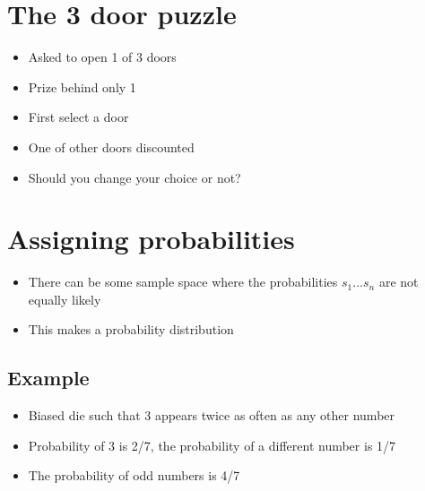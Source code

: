 \documentclass{article}[18pt]
\begin{document}
\section{The 3 door puzzle}
\begin{itemize}
\item Asked to open 1 of 3 doors
\item Prize behind only 1
\item First select a door
\item One of other doors discounted
\item Should you change your choice or not?
\end{itemize}
\section{Assigning probabilities}
\begin{itemize}
\item There can be some sample space where the probabilities $s_1...s_n$ are not equally likely
\item This makes a probability distribution
\end{itemize}
\subsection{Example}
\begin{itemize}
\item Biased die such that 3 appears twice as often as any other number
\item Probability of 3 is 2/7, the probability of a different number is 1/7
\item The probability of odd numbers is 4/7
\end{itemize}
\end{document}
